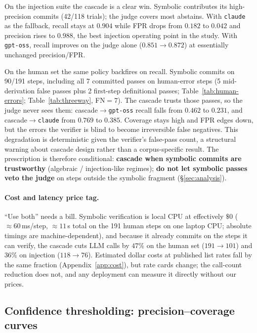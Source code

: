 On the injection suite the cascade is a clear win. Symbolic contributes its
high-precision commits (42/118 trials); the judge covers most abstains. With
\texttt{claude} as the fallback, recall stays at $0.904$ while FPR drops from
$0.182$ to $0.042$ and precision rises to $0.988$, the best injection operating
point in the study. With \texttt{gpt-oss}, recall improves on the judge alone
($0.851\rightarrow 0.872$) at essentially unchanged precision/FPR.

On the human set the same policy backfires on recall. Symbolic commits on
90/191 steps, including all 7 committed passes on human-error steps (5
mid-derivation false passes plus 2 first-step definitional passes;
Table~\ref{tab:human-errors}; Table~\ref{tab:threeway}, FN$=7$). The cascade
trusts those passes, so the judge never sees them:
cascade$\rightarrow$\texttt{gpt-oss} recall falls from $0.462$ to $0.231$, and
cascade$\rightarrow$\texttt{claude} from $0.769$ to $0.385$. Coverage stays high
and FPR edges down, but the errors the verifier is blind to become irreversible
false negatives. This degradation is deterministic given the verifier's
false-pass count, a structural warning about cascade design rather than a
corpus-specific result. The prescription is therefore conditional: \textbf{cascade when
symbolic commits are trustworthy} (algebraic / injection-like regimes);
\textbf{do not let symbolic passes veto the judge} on steps outside the symbolic
fragment (\S\ref{sec:analysis}).

\paragraph{Cost and latency price tag.}
``Use both'' needs a bill. Symbolic verification is local CPU at effectively
$\$0$ ($\approx\!60$\,ms/step, $\approx 11$\,s total on the 191 human steps on
one laptop CPU; absolute timings are machine-dependent), and because it
already commits on the steps it can verify, the cascade cuts LLM calls by
$47\%$ on the human set ($191\!\rightarrow\!101$) and $36\%$ on injection
($118\!\rightarrow\!76$). Estimated dollar costs at published list rates fall
by the same fraction (Appendix~\ref{app:cost}), but rate cards change; the
call-count reduction does not, and any deployment can measure it directly
without our prices.

\subsection{Confidence thresholding: precision--coverage curves}
\label{sec:confidence}

